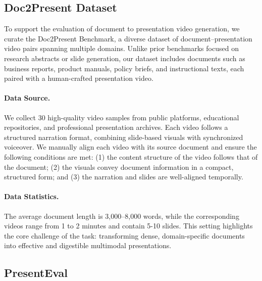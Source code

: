 \documentclass[11pt]{article}
\begin{document}
\subsection{Doc2Present Dataset}

To support the evaluation of document to presentation video generation, we curate the Doc2Present Benchmark, a diverse dataset of document–presentation video pairs spanning multiple domains. Unlike prior benchmarks focused on research abstracts or slide generation, our dataset includes documents such as business reports, product manuals, policy briefs, and instructional texts, each paired with a human-crafted presentation video.

\paragraph{Data Source.} We collect 30 high-quality video samples from public platforms, educational repositories, and professional presentation archives. Each video follows a structured narration format, combining slide-based visuals with synchronized voiceover. We manually align each video with its source document and ensure the following conditions are met: (1) the content structure of the video follows that of the document; (2) the visuals convey document information in a compact, structured form; and (3) the narration and slides are well-aligned temporally.

\paragraph{Data Statistics.} The average document length is 3,000–8,000 words, while the corresponding videos range from 1 to 2 minutes and contain 5-10 slides. This setting highlights the core challenge of the task: transforming dense, domain-specific documents into effective and digestible multimodal presentations.


 



















\subsection{PresentEval}
\label{sec:presenteval}
\end{document}
